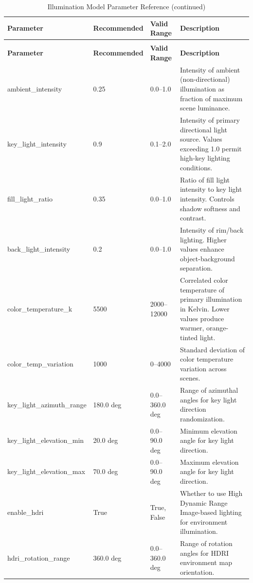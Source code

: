 \begin{longtable}{p{3.5cm}p{2cm}p{2.5cm}p{5.5cm}}
\caption{Illumination Model Parameter Reference} \label{tab:illumination} \\
\toprule
\textbf{Parameter} & \textbf{Recommended} & \textbf{Valid Range} & \textbf{Description} \\
\midrule
\endfirsthead
\caption[]{Illumination Model Parameter Reference (continued)} \\
\toprule
\textbf{Parameter} & \textbf{Recommended} & \textbf{Valid Range} & \textbf{Description} \\
\midrule
\endhead
\bottomrule
\endfoot
\bottomrule
\endlastfoot
ambient\_intensity & 0.25 & 0.0--1.0 & Intensity of ambient (non-directional) illumination as fraction of maximum scene luminance. \\
\addlinespace
key\_light\_intensity & 0.9 & 0.1--2.0 & Intensity of primary directional light source. Values exceeding 1.0 permit high-key lighting conditions. \\
\addlinespace
fill\_light\_ratio & 0.35 & 0.0--1.0 & Ratio of fill light intensity to key light intensity. Controls shadow softness and contrast. \\
\addlinespace
back\_light\_intensity & 0.2 & 0.0--1.0 & Intensity of rim/back lighting. Higher values enhance object-background separation. \\
\addlinespace
color\_temperature\_k & 5500 & 2000--12000 & Correlated color temperature of primary illumination in Kelvin. Lower values produce warmer, orange-tinted light. \\
\addlinespace
color\_temp\_variation & 1000 & 0--4000 & Standard deviation of color temperature variation across scenes. \\
\addlinespace
key\_light\_azimuth\_range & 180.0 deg & 0.0--360.0 deg & Range of azimuthal angles for key light direction randomization. \\
\addlinespace
key\_light\_elevation\_min & 20.0 deg & 0.0--90.0 deg & Minimum elevation angle for key light direction. \\
\addlinespace
key\_light\_elevation\_max & 70.0 deg & 0.0--90.0 deg & Maximum elevation angle for key light direction. \\
\addlinespace
enable\_hdri & True & True, False & Whether to use High Dynamic Range Image-based lighting for environment illumination. \\
\addlinespace
hdri\_rotation\_range & 360.0 deg & 0.0--360.0 deg & Range of rotation angles for HDRI environment map orientation. \\

\end{longtable}
